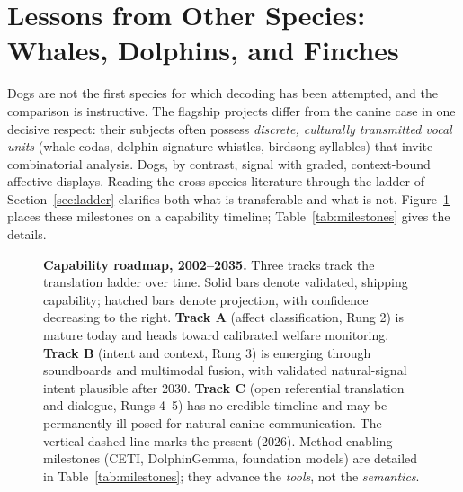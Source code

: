 \section{Lessons from Other Species: Whales, Dolphins, and Finches}
\label{sec:crossspecies}

Dogs are not the first species for which decoding has been attempted, and
the comparison is instructive. The flagship projects differ from the canine
case in one decisive respect: their subjects often possess \emph{discrete,
culturally transmitted vocal units} (whale codas, dolphin signature
whistles, birdsong syllables) that invite combinatorial analysis. Dogs, by
contrast, signal with graded, context-bound affective displays. Reading the
cross-species literature through the ladder of Section~\ref{sec:ladder}
clarifies both what is transferable and what is not.
Figure~\ref{fig:roadmap} places these milestones on a capability timeline;
Table~\ref{tab:milestones} gives the details.

\begin{figure}[t]
\centering

\caption{\textbf{Capability roadmap, 2002--2035.} Three tracks track the
translation ladder over time. Solid bars denote validated, shipping
capability; hatched bars denote projection, with confidence decreasing to
the right. \textbf{Track A} (affect classification, Rung 2) is mature today
and heads toward calibrated welfare monitoring. \textbf{Track B} (intent and
context, Rung 3) is emerging through soundboards and multimodal fusion, with
validated natural-signal intent plausible after 2030. \textbf{Track C} (open
referential translation and dialogue, Rungs 4--5) has no credible timeline
and may be permanently ill-posed for natural canine communication. The
vertical dashed line marks the present (2026). Method-enabling milestones
(CETI, DolphinGemma, foundation models) are detailed in
Table~\ref{tab:milestones}; they advance the \emph{tools}, not the
\emph{semantics}.}
\label{fig:roadmap}
\end{figure}

